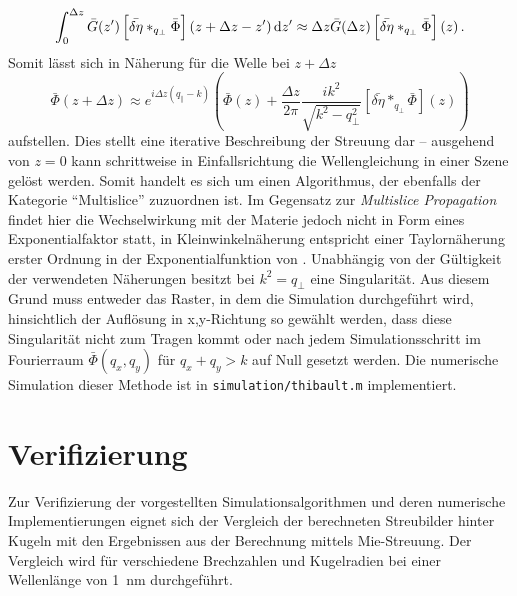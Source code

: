 \begin{equation}
	\int_{0}^{\Delta z} \bar{G}(z')\left[\bar{\delta\eta}\ast_{q_\perp} \bar{\Phi}\right](z+\Delta z-z')\dif z'
	\approx
	\Delta z \bar{G}(\Delta z)\left[\bar{\delta\eta}\ast_{q_\perp} \bar{\Phi}\right](z) \,.
\end{equation}
Somit lässt sich in Näherung für die Welle bei $z+\Delta z$
\begin{equation}
	\label{eq:thibault}
	\bar{\Phi}(z+\Delta z)
	\approx
	e^{i\Delta z(q_\parallel-k)}
	\left(
	\bar{\Phi}(z)+\frac{\Delta z}{2\pi}\frac{ik^2}{\sqrt{k^2-q^2_\perp}}  \left[\bar{\delta\eta}\ast_{q_\perp} \bar{\Phi}\right](z)
	\right)
\end{equation}
aufstellen. Dies stellt eine iterative Beschreibung der Streuung dar -- ausgehend von $z=0$ kann schrittweise in Einfallsrichtung die Wellengleichung in einer Szene gelöst werden. Somit handelt es sich um einen Algorithmus, der ebenfalls der Kategorie "`Multislice"' zuzuordnen ist. Im Gegensatz zur \textit{Multislice Propagation} findet hier die Wechselwirkung mit der Materie jedoch nicht in Form eines Exponentialfaktor statt, in Kleinwinkelnäherung entspricht  einer Taylornäherung erster Ordnung in der Exponentialfunktion von . Unabhängig von der Gültigkeit der verwendeten Näherungen besitzt  bei $k^2=q_\perp$ eine Singularität. Aus diesem Grund muss entweder das Raster, in dem die Simulation durchgeführt wird, hinsichtlich der Auflösung in x,y-Richtung so gewählt werden, dass diese Singularität nicht zum Tragen kommt oder nach jedem Simulationsschritt im Fourierraum $\bar{\Phi}(q_x,q_y)$ für $q_x+q_y>k$ auf Null gesetzt werden.
Die numerische Simulation dieser Methode ist in \texttt{simulation/thibault.m} implementiert.


\section{Verifizierung}
Zur Verifizierung der vorgestellten Simulationsalgorithmen und deren numerische Implementierungen eignet sich der Vergleich der berechneten Streubilder hinter Kugeln mit den Ergebnissen aus der Berechnung mittels Mie-Streuung. Der Vergleich wird für verschiedene Brechzahlen und Kugelradien bei einer Wellenlänge von \SI{1}{nm} durchgeführt.

